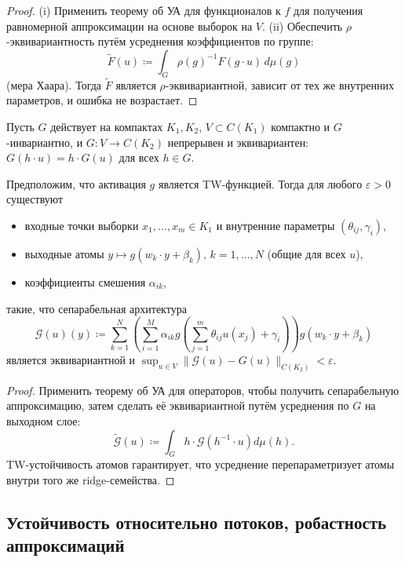 \documentclass[../NDCNNAI_main.tex]{subfiles}
\begin{document}
\begin{proof} (i) Применить теорему об УА для функционалов к \( f \) для получения равномерной аппроксимации на основе выборок на \( V \).
(ii) Обеспечить \( \rho \)-эквивариантность путём усреднения коэффициентов по группе:  
\[
\tilde{F}(u) \coloneq  \int_G \rho(g)^{-1} F(g \cdot u) \, d\mu(g)
\]  
(мера Хаара).  
Тогда \(\tilde{F}\) является \( \rho \)-эквивариантной, зависит от тех же внутренних параметров, и ошибка не возрастает.
\end{proof}


\begin{theorem}

Пусть \( G \) действует на компактах \( K_1, K_2 \), \( V \subset C(K_1) \) компактно и \( G \)-инвариантно, и \( G : V \to C(K_2) \) непрерывен и эквивариантен:
\(
G(h \cdot u) = h \cdot G(u) \text{ для всех } h \in G.
\)

Предположим, что активация \( g \) является TW-функцией. Тогда для любого \( \varepsilon > 0 \) существуют
\begin{itemize}
\item входные точки выборки \( x_1, \ldots, x_m \in K_1 \) и внутренние параметры \( (\theta_{ij}, \gamma_i) \),
\item выходные атомы \( y \mapsto g(w_k \cdot y + \beta_k), \, k = 1, \ldots, N \) (общие для всех \( u \)),
\item коэффициенты смешения \( \alpha_{ik} \),
\end{itemize}
такие, что сепарабельная архитектура
\[
\mathcal{G}(u)(y) \coloneq  \sum_{k=1}^{N} \left( \sum_{i=1}^{M} \alpha_{ik} g \left( \sum_{j=1}^{m} \theta_{ij} u(x_j) + \gamma_i \right) \right) g(w_k \cdot y + \beta_k)
\]
является эквивариантной и \( \sup_{u \in V} \|\mathcal{G}(u) - G(u)\|_{C(K_2)} < \varepsilon \).
\end{theorem}

\begin{proof}
Применить теорему об УА для операторов, чтобы получить сепарабельную аппроксимацию, затем сделать её эквивариантной путём усреднения по \( G \) на выходном слое:  
\[
\tilde{\mathcal{G}}(u) \coloneq  \int_G h \cdot \mathcal{G}(h^{-1} \cdot u) d\mu(h).
\]  
TW-устойчивость атомов гарантирует, что усреднение перепараметризует атомы внутри того же ridge-семейства.   
\end{proof}


\subsection{Устойчивость относительно потоков, робастность аппроксимаций}
\end{document}
